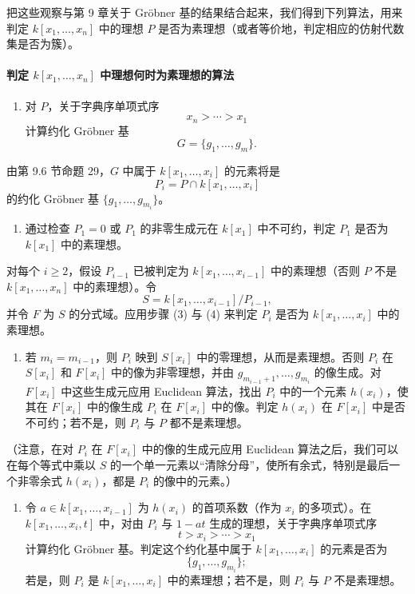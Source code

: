 把这些观察与第 9 章关于 Gröbner 基的结果结合起来，我们得到下列算法，用来判定 $k[x_1,\ldots,x_n]$ 中的理想 $P$ 是否为素理想（或者等价地，判定相应的仿射代数集是否为簇）。

\paragraph{判定 $k[x_1,\ldots,x_n]$ 中理想何时为素理想的算法}

\begin{enumerate}[label=(\arabic*)]
	\item 对 $P$，关于字典序单项式序
	\[
	x_n>\cdots>x_1
	\]
	计算约化 Gröbner 基
	\[
	G=\{g_1,\ldots,g_m\}.
	\]
\end{enumerate}
由第 9.6 节命题 29，$G$ 中属于 $k[x_1,\ldots,x_i]$ 的元素将是
\[
P_i=P\cap k[x_1,\ldots,x_i]
\]
的约化 Gröbner 基 $\{g_1,\ldots,g_{m_i}\}$。

\begin{enumerate}[label=(\arabic*),resume]
	\item 通过检查 $P_1=0$ 或 $P_1$ 的非零生成元在 $k[x_1]$ 中不可约，判定 $P_1$ 是否为 $k[x_1]$ 中的素理想。
\end{enumerate}
对每个 $i\ge2$，假设 $P_{i-1}$ 已被判定为 $k[x_1,\ldots,x_{i-1}]$ 中的素理想（否则 $P$ 不是 $k[x_1,\ldots,x_n]$ 中的素理想）。令
\[
S=k[x_1,\ldots,x_{i-1}]/P_{i-1},
\]
并令 $F$ 为 $S$ 的分式域。应用步骤 (3) 与 (4) 来判定 $P_i$ 是否为 $k[x_1,\ldots,x_i]$ 中的素理想。

\begin{enumerate}[label=(\arabic*),resume]
	\item 若 $m_i=m_{i-1}$，则 $P_i$ 映到 $S[x_i]$ 中的零理想，从而是素理想。否则 $P_i$ 在 $S[x_i]$ 和 $F[x_i]$ 中的像为非零理想，并由 $g_{m_{i-1}+1},\ldots,g_{m_i}$ 的像生成。对 $F[x_i]$ 中这些生成元应用 Euclidean 算法，找出 $P_i$ 中的一个元素 $h(x_i)$，使其在 $F[x_i]$ 中的像生成 $P_i$ 在 $F[x_i]$ 中的像。判定 $h(x_i)$ 在 $F[x_i]$ 中是否不可约；若不是，则 $P_i$ 与 $P$ 都不是素理想。
\end{enumerate}
（注意，在对 $P_i$ 在 $F[x_i]$ 中的像的生成元应用 Euclidean 算法之后，我们可以在每个等式中乘以 $S$ 的一个单一元素以“清除分母”，使所有余式，特别是最后一个非零余式 $h(x_i)$，都是 $P_i$ 的像中的元素。）

\begin{enumerate}[label=(\arabic*),resume]
	\item 令 $a\in k[x_1,\ldots,x_{i-1}]$ 为 $h(x_i)$ 的首项系数（作为 $x_i$ 的多项式）。在 $k[x_1,\ldots,x_i,t]$ 中，对由 $P_i$ 与 $1-at$ 生成的理想，关于字典序单项式序
	\[
	t>x_i>\cdots>x_1
	\]
	计算约化 Gröbner 基。判定这个约化基中属于 $k[x_1,\ldots,x_i]$ 的元素是否为
	\[
	\{g_1,\ldots,g_{m_i}\};
	\]
	若是，则 $P_i$ 是 $k[x_1,\ldots,x_i]$ 中的素理想；若不是，则 $P_i$ 与 $P$ 不是素理想。
\end{enumerate}

